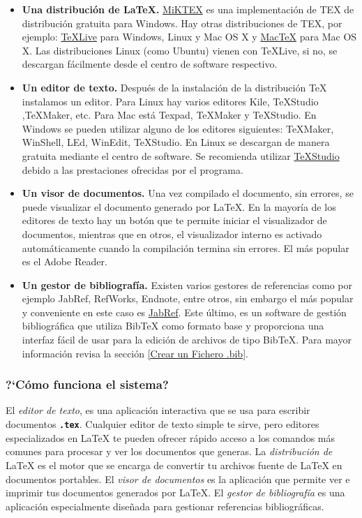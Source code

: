 \begin{itemize}
\item \textbf{Una distribución de \LaTeX{}.} \href{http://miktex.org/}{ MiKTEX} es una implementación de TEX de distribución gratuita para Windows. Hay otras distribuciones de TEX, por ejemplo: \href{http://www.tug.org/texlive/}{TeXLive} para Windows, Linux y Mac OS X y \href{http://tug.org/mactex/downloading.html}{MacTeX} para Mac OS X. Las distribuciones Linux (como Ubuntu) vienen con TeXLive, si no, se descargan f\'{a}cilmente desde el centro de software respectivo.
\item \textbf{Un editor de texto.} Después de la instalación de la distribución TeX instalamos un editor. Para Linux hay varios editores Kile, TeXStudio ,TeXMaker, etc. Para Mac está Texpad, TeXMaker y TeXStudio. En Windows se pueden utilizar alguno de los editores siguientes: TeXMaker, WinShell, LEd, WinEdit, TeXStudio. En Linux se descargan de manera gratuita mediante el centro de software. Se recomienda utilizar \href{http://texstudio.sourceforge.net/}{TeXStudio} debido a las prestaciones ofrecidas por el programa.
\item \textbf{Un visor de documentos.} Una vez compilado el documento, sin errores, se puede visualizar el documento generado por LaTeX. En la mayoría de los editores de texto hay un botón que te permite iniciar el visualizador de documentos, mientras que en otros, el visualizador interno es activado automáticamente cuando la compilación termina sin errores. El más popular es el Adobe Reader.
\item \textbf{Un gestor de bibliografía.} Existen varios gestores de referencias como por ejemplo JabRef, RefWorks, Endnote, entre otros, sin embargo el más popular y conveniente en este caso es \href{http://jabref.sourceforge.net/}{JabRef}. Este \'{u}ltimo, es un software de gestión bibliográfica que utiliza BibTeX como formato base y proporciona una interfaz fácil de usar para la edición de archivos de tipo BibTeX. Para mayor información revisa la sección \ref{Crear un Fichero .bib}.
 \end{itemize}

\subsubsection{?`C\'{o}mo funciona el sistema?}
El \textit{editor de texto}, es una aplicación interactiva que se usa para escribir documentos \texttt{\textbf{.tex}}. Cualquier editor de texto simple te sirve, pero editores especializados en \LaTeX{} te pueden ofrecer rápido acceso a los comandos más comunes para procesar y ver los documentos que generas. La \textit{distribución de} \LaTeX{} es el motor que se encarga de convertir tu archivos fuente de \LaTeX{} en documentos portables. El \textit{visor de documentos} es la aplicación que permite ver e imprimir tus documentos generados por \LaTeX{}. El \textit{gestor de bibliografía} es una aplicación especialmente diseñada para gestionar referencias bibliográficas.

